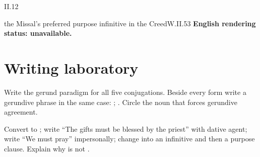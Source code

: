 \begin{courseunit}{II.12}
\begin{workedexample}{the Missal's preferred purpose infinitive in the Creed}{W.II.53}
\textbf{English rendering status: unavailable.}
\end{workedexample}

\section{Writing laboratory}

Write the gerund paradigm for all five conjugations.  Beside every form write a gerundive
phrase in the same case: ; .  Circle the noun that forces gerundive agreement.

Convert  to ; write ``The gifts must be
blessed by the priest'' with dative agent; write ``We must pray'' impersonally; change
 into an infinitive and then a purpose clause.  Explain why
 is not .



\end{courseunit}

